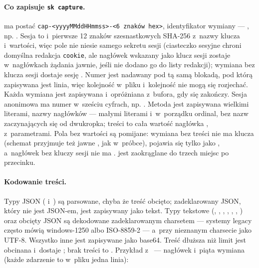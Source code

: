 \paragraph{Co zapisuje \texttt{sk capture}.}  ma postać
\texttt{cap-<yyyyMMddHHmmss>-<6 znaków hex>}, identyfikator wymiany ---
, np. . Sesja to  i~pierwsze 12
znaków szesnastkowych SHA-256 z~nazwy klucza i~wartości, więc pole  nie niesie
samego sekretu sesji (ciasteczko sesyjne chroni domyślna redakcja \texttt{cookie}, ale nagłówek wskazany
jako klucz sesji zostaje w~nagłówkach żądania jawnie, jeśli nie dodano go do listy redakcji);
wymiana bez klucza sesji dostaje sesję . Numer
 jest nadawany pod tą samą blokadą, pod którą zapisywana jest linia, więc
kolejność w~pliku i~kolejność  nie mogą się rozjechać. Każda wymiana jest
zapisywana i~opróżniana z~bufora, gdy się zakończy. Sesja anonimowa ma numer w~sześciu
cyfrach, np. . Metoda jest zapisywana wielkimi literami, nazwy nagłówków
--- małymi literami i~w~porządku ordinal, bez nazw zaczynających się od dwukropka;
 treści to cała wartość nagłówka ,
z~parametrami. Pola bez wartości są pomijane: wymiana bez treści nie ma klucza
 (schemat przyjmuje też jawne , jak w~próbce),
 pojawia się tylko jako , a~nagłówek bez kluczy sesji nie
ma .  jest zaokrąglane do trzech miejsc po
przecinku.

\paragraph{Kodowanie treści.} Typy JSON ( i~)
są parsowane, chyba że treść obcięto; zadeklarowany JSON, który nie jest JSON-em, jest
zapisywany jako tekst. Typy tekstowe (, ,
, ,
, , )
oraz obcięty JSON są dekodowane zadeklarowanym charsetem --- systemy legacy często mówią
windows-1250 albo ISO-8859-2 --- a~przy nieznanym charsecie jako UTF-8. Wszystko inne jest
zapisywane jako base64. Treść dłuższa niż limit jest obcinana i~dostaje
; brak treści to . Przykład z~ --- nagłówek i~piąta wymiana (każde zdarzenie to w~pliku
jedna linia):

